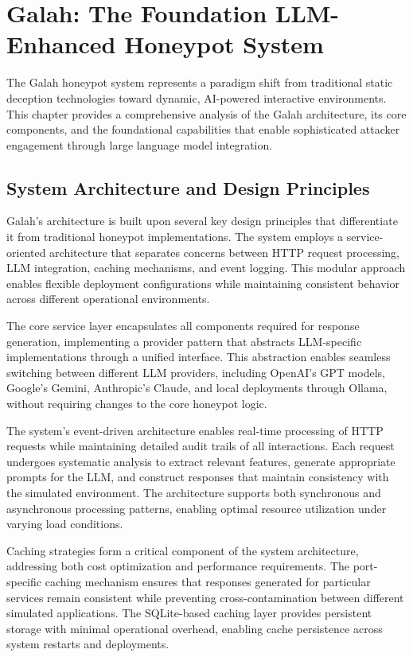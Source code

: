 \chapter{Galah: The Foundation LLM-Enhanced Honeypot System}

The Galah honeypot system represents a paradigm shift from traditional static deception technologies toward dynamic, AI-powered interactive environments. This chapter provides a comprehensive analysis of the Galah architecture, its core components, and the foundational capabilities that enable sophisticated attacker engagement through large language model integration.

\section{System Architecture and Design Principles}

Galah's architecture is built upon several key design principles that differentiate it from traditional honeypot implementations. The system employs a service-oriented architecture that separates concerns between HTTP request processing, LLM integration, caching mechanisms, and event logging. This modular approach enables flexible deployment configurations while maintaining consistent behavior across different operational environments.

The core service layer encapsulates all components required for response generation, implementing a provider pattern that abstracts LLM-specific implementations through a unified interface. This abstraction enables seamless switching between different LLM providers, including OpenAI's GPT models, Google's Gemini, Anthropic's Claude, and local deployments through Ollama, without requiring changes to the core honeypot logic.

The system's event-driven architecture enables real-time processing of HTTP requests while maintaining detailed audit trails of all interactions. Each request undergoes systematic analysis to extract relevant features, generate appropriate prompts for the LLM, and construct responses that maintain consistency with the simulated environment. The architecture supports both synchronous and asynchronous processing patterns, enabling optimal resource utilization under varying load conditions.

Caching strategies form a critical component of the system architecture, addressing both cost optimization and performance requirements. The port-specific caching mechanism ensures that responses generated for particular services remain consistent while preventing cross-contamination between different simulated applications. The SQLite-based caching layer provides persistent storage with minimal operational overhead, enabling cache persistence across system restarts and deployments.

